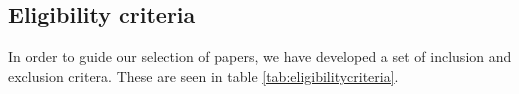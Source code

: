 \subsection{Eligibility criteria}
    
In order to guide our selection of papers, we have developed a set of inclusion and exclusion critera. These are seen in table \ref{tab:eligibilitycriteria}. 

